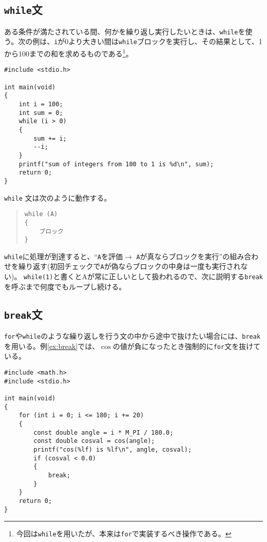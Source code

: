 \subsection{\texttt{while}文}
ある条件が満たされている間、何かを繰り返し実行したいときは、\texttt{while}を使う。次の例は、\texttt{i}が0より大きい間は\texttt{while}ブロックを実行し、その結果として、1から100までの和を求めるものである\footnote{今回は\texttt{while}を用いたが、本来は\texttt{for}で実装するべき操作である。}。
\begin{reidai}\label{ex:while}
\begin{verbatim}
#include <stdio.h>

int main(void)
{
    int i = 100;
    int sum = 0;
    while (i > 0)
    {
        sum += i;
        --i;
    }
    printf("sum of integers from 100 to 1 is %d\n", sum);
    return 0;
}
\end{verbatim}
\end{reidai} \noindent
\texttt{while} 文は次のように動作する。
\begin{quote}
\begin{verbatim}
while (A)
{
    ブロック
}
\end{verbatim}
\end{quote}
\texttt{while}に処理が到達すると、``\texttt{A}を評価\(\rightarrow\) \texttt{A}が真ならブロックを実行''の組み合わせを繰り返す(初回チェックで\texttt{A}が偽ならブロックの中身は一度も実行されない)。
\texttt{while(1)}と書くとAが常に正しいとして扱われるので、次に説明する\texttt{break}を呼ぶまで何度でもループし続ける。

\subsection{\texttt{break}文}
\texttt{for}や\texttt{while}のような繰り返しを行う文の中から途中で抜けたい場合には、\texttt{break}を用いる。例\ref{ex:break}では、\(\cos\)の値が負になったとき強制的に\texttt{for}文を抜けている。
\begin{reidai}\label{ex:break}
    \begin{verbatim}
#include <math.h>
#include <stdio.h>

int main(void)
{
    for (int i = 0; i <= 180; i += 20)
    {
        const double angle = i * M_PI / 180.0;
        const double cosval = cos(angle);
        printf("cos(%lf) is %lf\n", angle, cosval);
        if (cosval < 0.0)
        {
            break;
        }
    }
    return 0;
}
\end{verbatim}
\end{reidai}

